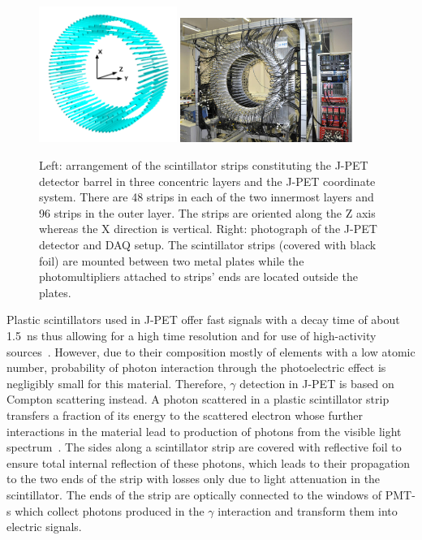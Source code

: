 \begin{figure}[h!]
  \centering
  \includegraphics[width=0.4\textwidth]{Chapter3_detectors/img/pet3dxyz}
  \hspace{1em}     
  \includegraphics[width=0.5\textwidth]{Chapter3_detectors/img/pet_lab} 
  \caption{Left: arrangement of the scintillator strips constituting the J-PET detector barrel in three concentric layers and the J-PET coordinate system. There are 48 strips in each of the two innermost layers and 96 strips in the outer layer. The strips are oriented along the Z axis whereas the X direction is vertical. Right: photograph of the J-PET detector and DAQ setup. The scintillator strips (covered with black foil) are mounted between two metal plates while the photomultipliers attached to strips' ends are located outside the plates.}\label{fig:jpet_detector}
\end{figure}

Plastic scintillators used in J-PET offer fast signals with a decay time of about 1.5~ns thus allowing for a high time resolution and for use of high-activity sources~\cite{gajos_gps}. However, due to their composition mostly of elements with a low atomic number, probability of photon interaction through the photoelectric effect is negligibly small for this material. Therefore, $\gamma$ detection in J-PET is based on Compton scattering instead. A photon scattered in a plastic scintillator strip transfers a fraction of its energy to the scattered electron whose further interactions in the material lead to production of photons from the visible light spectrum~\cite{anna_scints}. The sides along a scintillator strip are covered with reflective foil to ensure total internal reflection of these photons, which leads to their propagation to the two ends of the strip with losses only due to light attenuation in the scintillator. The ends of the strip are optically connected to the windows of \mbox{PMT-s} which collect photons produced in the $\gamma$ interaction and transform them into electric signals.


